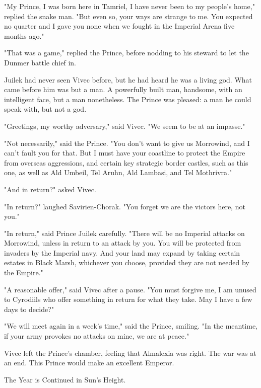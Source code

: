 "My Prince, I was born here in Tamriel, I have never been to my people's home," replied the snake man. "But even so, your ways are strange to me. You expected no quarter and I gave you none when we fought in the Imperial Arena five months ago."

"That was a game," replied the Prince, before nodding to his steward to let the Dunmer battle chief in.

Juilek had never seen Vivec before, but he had heard he was a living god. What came before him was but a man. A powerfully built man, handsome, with an intelligent face, but a man nonetheless. The Prince was pleased: a man he could speak with, but not a god.

"Greetings, my worthy adversary," said Vivec. "We seem to be at an impasse."

"Not necessarily," said the Prince. "You don't want to give us Morrowind, and I can't fault you for that. But I must have your coastline to protect the Empire from overseas aggressions, and certain key strategic border castles, such as this one, as well as Ald Umbeil, Tel Aruhn, Ald Lambasi, and Tel Mothrivra."

"And in return?" asked Vivec.

"In return?" laughed Savirien-Chorak. "You forget we are the victors here, not you."

"In return," said Prince Juilek carefully. "There will be no Imperial attacks on Morrowind, unless in return to an attack by you. You will be protected from invaders by the Imperial navy. And your land may expand by taking certain estates in Black Marsh, whichever you choose, provided they are not needed by the Empire."

"A reasonable offer," said Vivec after a pause. "You must forgive me, I am unused to Cyrodiils who offer something in return for what they take. May I have a few days to decide?"

"We will meet again in a week's time," said the Prince, smiling. "In the meantime, if your army provokes no attacks on mine, we are at peace."

Vivec left the Prince's chamber, feeling that Almalexia was right. The war was at an end. This Prince would make an excellent Emperor.

The Year is Continued in Sun's Height.
